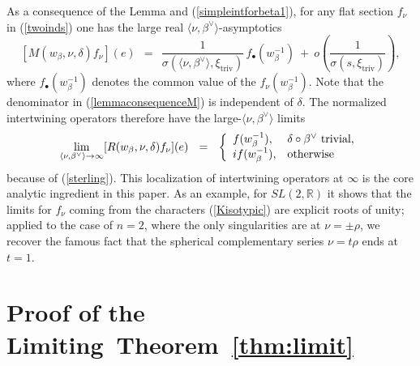 \documentclass[12pt]{article}
\newcommand{\thmref}[1]{Theorem~\ref{#1}}
\numberwithin{equation}{section}
\renewcommand\b{\beta}
\renewcommand\d{\delta}
\newcommand{\R}{{\mathbb{R}}}
\renewcommand\i{^{-1}}
\renewcommand\({\left(}
\renewcommand\){\right)}
\begin{document}
As a consequence of the Lemma and (\ref{simpleintforbeta1}), for any flat section $f_\nu$ in (\ref{twoinds}) one has the large real $\langle \nu,\beta^\vee\rangle$-asymptotics 
\begin{equation}\label{lemmaconsequenceM}
  [M(w_\b,\nu,\d)f_\nu](e) \ \ = \  \ \frac{1}{\sigma(\langle \nu,\b^\vee\rangle,\xi_\text{triv})}\,f_\bullet(w_\beta\i) \ + \  o\(\frac{1}{\sigma(s,\xi_\text{triv})}\),
\end{equation}
where $f_\bullet (w_\beta\i)$ denotes the common value of the $f_\nu(w_\beta\i)$.
Note that the denominator in (\ref{lemmaconsequenceM}) is independent of $\delta$. The normalized intertwining operators therefore have the large-$\langle \nu,\beta^\vee\rangle$ limits
\begin{equation}\label{lemmaconsequenceR}
 \lim_{  \langle \nu,\beta^\vee\rangle\rightarrow\infty} [R(w_\b,\nu,\d)f_\nu](e) \ \ = \  \
\left\{
  \begin{array}{ll}
    f(w_\beta\i), & \d\circ \beta^\vee\text{~trivial}, \\
    if(w_\beta\i), & \hbox{otherwise}
  \end{array}
\right.
\end{equation}
because of (\ref{sterling}).
This localization of intertwining operators at $\infty$ is the core analytic ingredient in this paper.  As an example, for $SL(2,\R)$ it shows that the limits for $f_\nu$ coming from the characters (\ref{Kisotypic}) are explicit roots of unity; applied to the case of $n=2$, where the only singularities are at $\nu=\pm \rho$, we recover the famous fact that the spherical complementary series  $\nu=t\rho$ ends at  $t=1$.



\section{Proof of the  Limiting~\thmref{thm:limit}}\label{sec:limittheorem}
\end{document}

